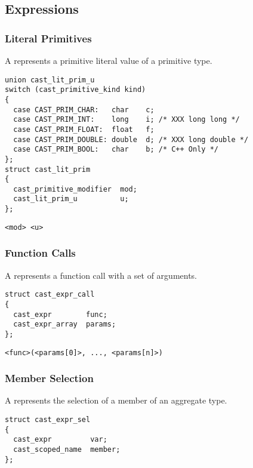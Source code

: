 

\subsection{Expressions}
\label{subsec:CAST:Expressions}

\subsubsection{Literal Primitives}

A  represents a primitive literal value of a primitive
type.

\begin{verbatim}
union cast_lit_prim_u
switch (cast_primitive_kind kind)
{
  case CAST_PRIM_CHAR:   char    c;
  case CAST_PRIM_INT:    long    i; /* XXX long long */
  case CAST_PRIM_FLOAT:  float   f;
  case CAST_PRIM_DOUBLE: double  d; /* XXX long double */
  case CAST_PRIM_BOOL:   char    b; /* C++ Only */
};
struct cast_lit_prim
{
  cast_primitive_modifier  mod;
  cast_lit_prim_u          u;
};
\end{verbatim}

\begin{verbatim}
<mod> <u>
\end{verbatim}

\subsubsection{Function Calls}

A  represents a function call with a set of arguments.

\begin{verbatim}
struct cast_expr_call
{
  cast_expr        func;
  cast_expr_array  params;
};
\end{verbatim}

\begin{verbatim}
<func>(<params[0]>, ..., <params[n]>)
\end{verbatim}

\subsubsection{Member Selection}

A  represents the selection of a member of an aggregate
type.

\begin{verbatim}
struct cast_expr_sel
{
  cast_expr         var;
  cast_scoped_name  member;
};
\end{verbatim}

